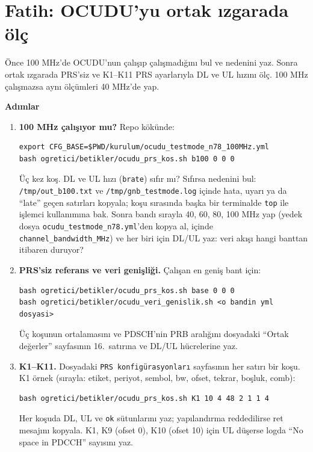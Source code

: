 \documentclass[11pt,a4paper]{article}
\begin{document}
\clearpage
\section*{Fatih: OCUDU'yu ortak ızgarada ölç}
\begin{amac}
Önce 100 MHz'de OCUDU'nun çalışıp çalışmadığını bul ve nedenini yaz. Sonra ortak ızgarada PRS'siz ve K1--K11 PRS ayarlarıyla DL ve UL hızını ölç. 100 MHz çalışmazsa aynı ölçümleri 40 MHz'de yap.
\end{amac}

\textbf{Adımlar}
\begin{enumerate}[leftmargin=1.6em]
\item \textbf{100 MHz çalışıyor mu?} Repo kökünde:
\begin{lstlisting}
export CFG_BASE=$PWD/kurulum/ocudu_testmode_n78_100MHz.yml
bash ogretici/betikler/ocudu_prs_kos.sh b100 0 0 0
\end{lstlisting}
Üç kez koş. DL ve UL hızı (\texttt{brate}) sıfır mı? Sıfırsa nedenini bul: \texttt{/tmp/out\_b100.txt} ve \texttt{/tmp/gnb\_testmode.log} içinde hata, uyarı ya da ``late'' geçen satırları kopyala; koşu sırasında başka bir terminalde \texttt{top} ile işlemci kullanımına bak. Sonra bandı sırayla 40, 60, 80, 100 MHz yap (yedek dosya \texttt{ocudu\_testmode\_n78.yml}'den kopya al, içinde \texttt{channel\_bandwidth\_MHz}) ve her biri için DL/UL yaz: veri akışı hangi banttan itibaren duruyor?
\item \textbf{PRS'siz referans ve veri genişliği.} Çalışan en geniş bant için:
\begin{lstlisting}
bash ogretici/betikler/ocudu_prs_kos.sh base 0 0 0
bash ogretici/betikler/ocudu_veri_genislik.sh <o bandin yml dosyasi>
\end{lstlisting}
Üç koşunun ortalamasını ve PDSCH'nin PRB aralığını dosyadaki ``Ortak değerler'' sayfasının 16.\ satırına ve DL/UL hücrelerine yaz.
\item \textbf{K1--K11.} Dosyadaki \texttt{PRS konfigürasyonları} sayfasının her satırı bir koşu. K1 örnek (sırayla: etiket, periyot, sembol, bw, ofset, tekrar, boşluk, comb):
\begin{lstlisting}
bash ogretici/betikler/ocudu_prs_kos.sh K1 10 4 48 2 1 1 4
\end{lstlisting}
Her koşuda DL, UL ve \texttt{ok} sütunlarını yaz; yapılandırma reddedilirse ret mesajını kopyala. K1, K9 (ofset 0), K10 (ofset 10) için UL düşerse logda ``No space in PDCCH'' sayısını yaz.

\end{enumerate}
\end{document}
